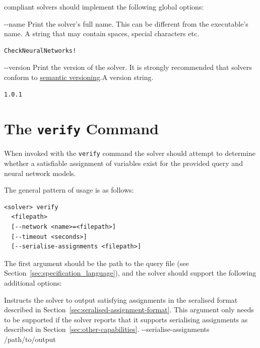 \vnnlib{} compliant solvers should implement the following global options:

\clOutputOption
{-{}-name}
{Print the solver's full name. This can be different from the executable's name.}
{A string that may contain spaces, special characters etc.}
\begin{lstlisting}[style=bash]
%*\exampleSolver* --name
CheckNeuralNetworks!
\end{lstlisting}

\clOutputOption
{-{}-version}
{Print the version of the solver. It is strongly recommended that solvers conform to \href{https://semver.org/}{semantic versioning}.}{A version string.}
\begin{lstlisting}[style=bash]
%*\exampleSolver* --version
1.0.1
\end{lstlisting}


\section{The \texttt{verify} Command}
\label{sec:verify_command}

When invoked with the \texttt{verify} command  the solver should attempt to determine whether a satisfiable assignment of variables exist for the provided \vnnlib{} query and neural network models.

The general pattern of usage is as follows:
\begin{lstlisting}[style=bash]
<solver> verify 
  <filepath>
  [--network <name>=<filepath>]
  [--timeout <seconds>]
  [--serialise-assignments <filepath>]
\end{lstlisting}
The first argument should be the path to the \vnnlib{} query file (see Section~\ref{sec:specification_language}), and the solver should support the following additional options:



{Instructs the solver to output satisfying assignments in the seralised format described in Section~\ref{sec:seralised-assignment-format}. This argument only needs to be supported if the solver reports that it supports serialising assignments as described in Section~\ref{sec:other-capabilities}.}
{{-}-serialise-assignments /path/to/output}

